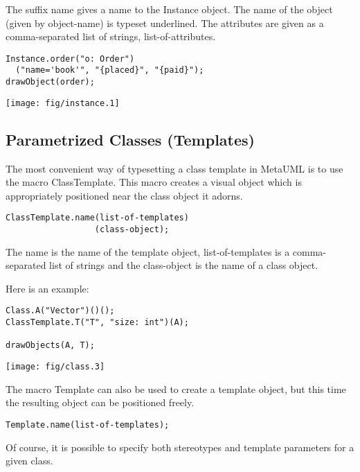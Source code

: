\documentclass{article}
\newcommand{\code}{\ttfamily}
\begin{document}
The suffix {\code name} gives a name to the {\code Instance} object. The name of the object (given by {\code object-name}) is typeset underlined. The attributes are given as a comma-separated list of strings, {\code list-of-attributes}.

\begin{multicols}{2}
\begin{verbatim}
Instance.order("o: Order")
  ("name='book'", "{placed}", "{paid}");
drawObject(order);
\end{verbatim}
\columnbreak
\hspace{2cm}\texttt{[image: fig/instance.1]}
\end{multicols}


\subsection{Parametrized Classes (Templates)}

The most convenient way of typesetting a class template in MetaUML is to use the macro {\code ClassTemplate}.
This macro creates a visual object which is appropriately positioned near the class object it adorns.

\begin{verbatim}
ClassTemplate.name(list-of-templates)
                  (class-object);
\end{verbatim}

The {\code name} is the name of the template object, {\code list-of-templates} is a comma-separated list of strings and the {\code class-object} is the name of a class object.

Here is an example:

\begin{multicols}{2}
\begin{verbatim}
Class.A("Vector")()();
ClassTemplate.T("T", "size: int")(A);

drawObjects(A, T);
\end{verbatim}
\columnbreak
\hspace{1cm}\texttt{[image: fig/class.3]}
\end{multicols}

The macro {\code Template} can also be used to create a template object, but this time the resulting
object can be positioned freely.

\begin{verbatim}
Template.name(list-of-templates);
\end{verbatim}

Of course, it is possible to specify both stereotypes and template parameters for a given class.
\end{document}
